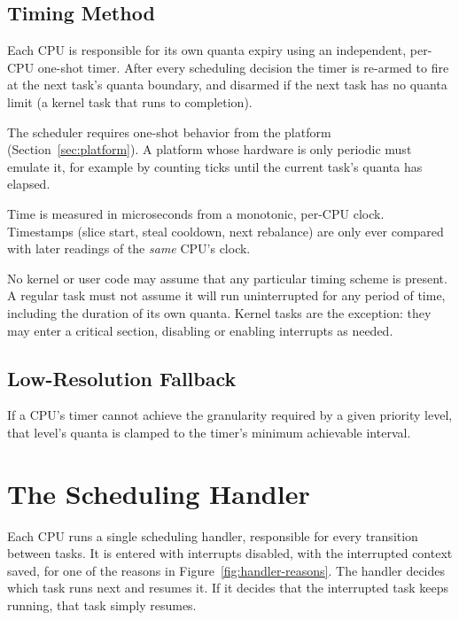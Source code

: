 \documentclass[11pt]{article}
\begin{document}
\subsection{Timing Method}

Each CPU is responsible for its own quanta expiry using an independent, per-CPU one-shot timer.
After every scheduling decision the timer is re-armed to fire at the next task's quanta boundary, and disarmed if the next task has no quanta limit (a kernel task that runs to completion).

The scheduler requires one-shot behavior from the platform (Section~\ref{sec:platform}). A platform whose hardware is only periodic must emulate it, for example by counting ticks until the current task's quanta has elapsed.

Time is measured in microseconds from a monotonic, per-CPU clock. Timestamps (slice start, steal cooldown, next rebalance) are only ever compared with later readings of the \textit{same} CPU's clock.

No kernel or user code may assume that any particular timing scheme is present.
A regular task must not assume it will run uninterrupted for any period of time, including the duration of its own quanta.
Kernel tasks are the exception: they may enter a critical section, disabling or enabling interrupts as needed.

\subsection{Low-Resolution Fallback}

If a CPU's timer cannot achieve the granularity required by a given priority level, that level's quanta is clamped to the timer's minimum achievable interval.

\section{The Scheduling Handler}
\label{sec:scheduling-handler}

Each CPU runs a single scheduling handler, responsible for every transition between tasks.
It is entered with interrupts disabled, with the interrupted context saved, for one of the reasons in Figure~\ref{fig:handler-reasons}.
The handler decides which task runs next and resumes it. If it decides that the interrupted task keeps running, that task simply resumes.
\end{document}
